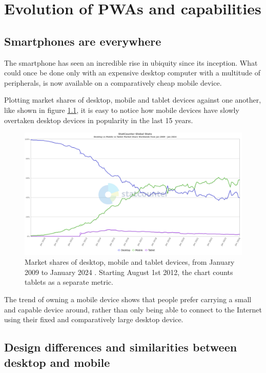 \chapter{Evolution of PWAs and capabilities}

\section{Smartphones are everywhere}

The smartphone has seen an incredible rise in ubiquity since its inception. What could once be done only with an expensive desktop computer with a multitude of peripherals, is now available on a comparatively cheap mobile device.

Plotting market shares of desktop, mobile and tablet devices against one another, like shown in figure \ref{FigStatCounterDMT}, it is easy to notice how mobile devices have slowly overtaken desktop devices in popularity in the last 15 years.

\begin{figure}[htbp]
    \centering
    \includegraphics[width=\textwidth]{./figures/ch1_desktop-vs-mobile.png}
    \caption{Market shares of desktop, mobile and tablet devices, from January 2009 to January 2024 \cite{StatCountDMT}. Starting August 1st 2012, the chart counts tablets as a separate metric.}
    \label{FigStatCounterDMT}
\end{figure}

The trend of owning a mobile device shows that people prefer carrying a small and capable device around, rather than only being able to connect to the Internet using their fixed and comparatively large desktop device.

\section{Design differences and similarities between desktop and mobile}

